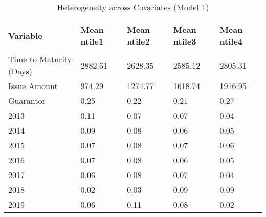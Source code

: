 \begin{table}[h!]
\caption{Heterogeneity across Covariates (Model 1)}
\label{Het}
\footnotesize
\begin{tabular}{lllll}
\\[-1.8ex]\hline 
\hline \\[-1.8ex] 
{\color[HTML]{333333} \textbf{Variable}} & {\color[HTML]{333333} \textbf{Mean ntile1}} & {\color[HTML]{333333} \textbf{Mean ntile2}} & {\color[HTML]{333333} \textbf{Mean ntile3}} & {\color[HTML]{333333} \textbf{Mean ntile4}} \\
\hline \\[-1.8ex] 
\cellcolor[HTML]{FFFFFF}Time to   Maturity (Days) & \cellcolor[HTML]{63BE7B}2882.61 & \cellcolor[HTML]{E6F3EC}2628.35 & \cellcolor[HTML]{FCFCFF}2585.12 & \cellcolor[HTML]{8BCF9E}2805.31 \\
\cellcolor[HTML]{FFFFFF}Issue Amount & \cellcolor[HTML]{FCFCFF}974.29 & \cellcolor[HTML]{CCE9D5}1274.77 & \cellcolor[HTML]{94D2A5}1618.74 & \cellcolor[HTML]{63BE7B}1916.95 \\
\cellcolor[HTML]{FFFFFF}Guarantor & \cellcolor[HTML]{D1EBDA}0.25 & \cellcolor[HTML]{D6EDDE}0.22 & \cellcolor[HTML]{D8EEE0}0.21 & \cellcolor[HTML]{CDE9D7}0.27 \\
\cellcolor[HTML]{FFFFFF}2013 & \cellcolor[HTML]{E9F5EF}0.11 & \cellcolor[HTML]{F0F8F5}0.07 & \cellcolor[HTML]{F0F8F5}0.07 & \cellcolor[HTML]{F5FAF9}0.04 \\
\cellcolor[HTML]{FFFFFF}2014 & \cellcolor[HTML]{EDF6F2}0.09 & \cellcolor[HTML]{EEF7F3}0.08 & \cellcolor[HTML]{F2F8F6}0.06 & \cellcolor[HTML]{F4F9F8}0.05 \\
\cellcolor[HTML]{FFFFFF}2015 & \cellcolor[HTML]{F0F8F5}0.07 & \cellcolor[HTML]{EEF7F3}0.08 & \cellcolor[HTML]{F0F8F5}0.07 & \cellcolor[HTML]{F2F8F6}0.06 \\
\cellcolor[HTML]{FFFFFF}2016 & \cellcolor[HTML]{F0F8F5}0.07 & \cellcolor[HTML]{EEF7F3}0.08 & \cellcolor[HTML]{F2F8F6}0.06 & \cellcolor[HTML]{F4F9F8}0.05 \\
\cellcolor[HTML]{FFFFFF}2017 & \cellcolor[HTML]{F2F8F6}0.06 & \cellcolor[HTML]{EEF7F3}0.08 & \cellcolor[HTML]{F0F8F5}0.07 & \cellcolor[HTML]{F5FAF9}0.04 \\
\cellcolor[HTML]{FFFFFF}2018 & \cellcolor[HTML]{F9FBFC}0.02 & \cellcolor[HTML]{F7FAFB}0.03 & \cellcolor[HTML]{EDF6F2}0.09 & \cellcolor[HTML]{EDF6F2}0.09 \\
\cellcolor[HTML]{FFFFFF}2019 & \cellcolor[HTML]{F2F8F6}0.06 & \cellcolor[HTML]{E9F5EF}0.11 & \cellcolor[HTML]{EEF7F3}0.08 & \cellcolor[HTML]{F9FBFC}0.02 \\

\end{tabular}
\end{table}
